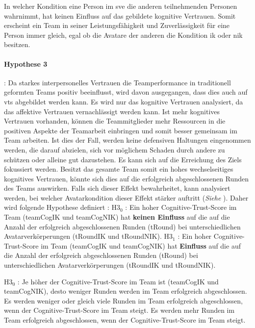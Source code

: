 \documentclass[a4paper,11pt]{article}%
\renewcommand{\\}{\vspace*{0.5\baselineskip} \newline}
\begin{document}
In welcher Kondition eine Person im \ac{sve} die \dq{}anderen\dq{} teilnehmenden Personen wahrnimmt, hat keinen Einfluss auf das gebildete kognitive Vertrauen. Somit erscheint ein Team in seiner Leistungsfähigkeit und Zuverlässigkeit für eine Person immer gleich, egal ob die Avatare der \dq{}anderen\dq{} die Kondition \ac{ik} oder \ac{nik} besitzen.
\paragraph{Hypothese 3}:
Da starkes interpersonelles Vertrauen die Teamperformance in traditionell geformten Teams positiv beeinflusst, wird davon ausgegangen, dass dies auch auf \ac{vts} abgebildet werden kann. Es wird nur das kognitive Vertrauen analysiert, da das affektive Vertrauen vernachlässigt werden kann. Ist mehr kognitives Vertrauen vorhanden, können die Teammitglieder mehr Ressourcen in die positiven Aspekte der Teamarbeit einbringen und somit besser gemeinsam im Team arbeiten. Ist dies der Fall, werden keine defensiven Haltungen eingenommen werden, die darauf abzielen, sich vor möglichem Schaden durch andere zu schützen oder alleine gut dazustehen. Es kann sich auf die Erreichung des Ziels fokussiert werden. Besitzt das gesamte Team somit ein hohes wechselseitiges kognitives Vertrauen, könnte sich dies auf die erfolgreich abgeschlossenen Runden des Teams auswirken. Falls sich dieser Effekt bewahrheitet, kann analysiert werden, bei welcher Avatarkondition dieser Effekt stärker auftritt (\textit{Siehe }). 
Daher wird folgende Hypothese definiert :\\
	H3$_{0}$ : Ein hoher Cognitive-Trust-Score im Team (\ac{teamCogIK} und \ac{teamCogNIK}) hat \textbf{keinen Einfluss} auf die auf die Anzahl der erfolgreich abgeschlossenen Runden (\ac{tRound}) bei unterschiedlichen Avatarverkörperungen (\ac{tRoundIK} und \ac{tRoundNIK}). \newline
	H3$_{1}$ : Ein hoher Cognitive-Trust-Score im Team (\ac{teamCogIK} und \ac{teamCogNIK}) hat \textbf{Einfluss} auf die auf die Anzahl der erfolgreich abgeschlossenen Runden (\ac{tRound}) bei unterschiedlichen Avatarverkörperungen (\ac{tRoundIK} und \ac{tRoundNIK}).

H3$_{0}$ : Je höher der Cognitive-Trust-Score im Team ist (\ac{teamCogIK} und \ac{teamCogNIK}), desto weniger Runden werden im Team erfolgreich abgeschlossen. 
Es werden weniger oder gleich viele Runden im Team erfolgreich abgeschlossen, wenn der Cognitive-Trust-Score im Team steigt.
Es werden mehr Runden im Team erfolgreich abgeschlossen, wenn der Cognitive-Trust-Score im Team steigt.
\end{document}
